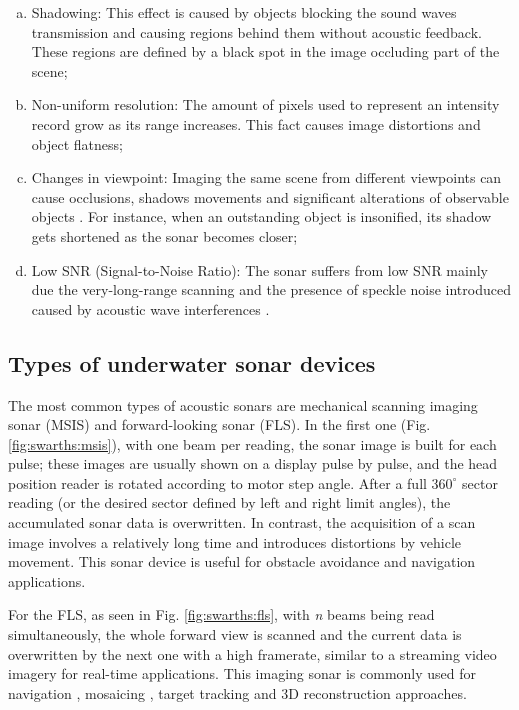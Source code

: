 \documentclass[final,5p,times]{elsarticle}
\begin{document}
\begin{enumerate}[(a)]
    \item Shadowing: This effect is caused by objects blocking the sound waves transmission and causing regions behind them without acoustic feedback. These regions are defined by a black spot in the image occluding part of the scene;
    \item Non-uniform resolution: The amount of pixels used to represent an intensity record grow as its range increases. This fact causes image distortions and object flatness;
    \item Changes in viewpoint: Imaging the same scene from different viewpoints can cause occlusions, shadows movements and significant alterations of observable objects \cite{hurtos2014}. For instance, when an outstanding object is insonified, its shadow gets shortened as the sonar becomes closer;
    \item Low SNR (Signal-to-Noise Ratio): The sonar suffers from low SNR mainly due the very-long-range scanning and the presence of speckle noise introduced caused by acoustic wave interferences \cite{abbott1979}.
\end{enumerate}


\subsection{Types of underwater sonar devices}
\label{sonar:devices}

The most common types of acoustic sonars are mechanical scanning imaging sonar (MSIS) and forward-looking sonar (FLS). In the first one (Fig. \ref{fig:swarths:msis}), with one beam per reading, the sonar image is built for each pulse; these images are usually shown on a display pulse by pulse, and the head position reader is rotated according to motor step angle. After a full $360^{\circ}$ sector reading (or the desired sector defined by left and right limit angles), the accumulated sonar data is overwritten. In contrast, the acquisition of a scan image involves a relatively long time and introduces distortions by vehicle movement. This sonar device is useful for obstacle avoidance \cite{ganesan2015} and navigation \cite{ribas2010} applications.

For the FLS, as seen in Fig. \ref{fig:swarths:fls}, with \textit{n} beams being read simultaneously, the whole forward view is scanned and the current data is overwritten by the next one with a high framerate, similar to a streaming video imagery for real-time applications. This imaging sonar is commonly used for navigation \cite{fallon2013}, mosaicing \cite{hurtos2014}, target tracking \cite{liu2016} and 3D reconstruction \cite{huang2015} approaches.
\end{document}
